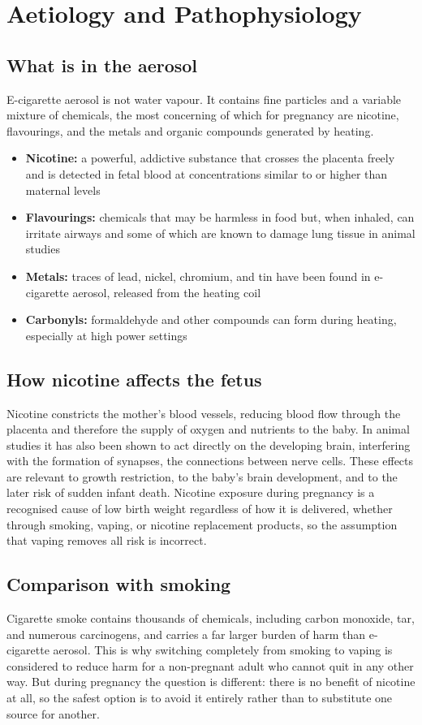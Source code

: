 \section*{Aetiology and Pathophysiology}
\subsection*{What is in the aerosol}
E-cigarette aerosol is not water vapour. It contains fine particles and a variable mixture of chemicals, the most concerning of which for pregnancy are nicotine, flavourings, and the metals and organic compounds generated by heating.

\begin{itemize}
    \item \textbf{Nicotine:} a powerful, addictive substance that crosses the placenta freely and is detected in fetal blood at concentrations similar to or higher than maternal levels
    \item \textbf{Flavourings:} chemicals that may be harmless in food but, when inhaled, can irritate airways and some of which are known to damage lung tissue in animal studies
    \item \textbf{Metals:} traces of lead, nickel, chromium, and tin have been found in e-cigarette aerosol, released from the heating coil
    \item \textbf{Carbonyls:} formaldehyde and other compounds can form during heating, especially at high power settings
\end{itemize}

\subsection*{How nicotine affects the fetus}
Nicotine constricts the mother's blood vessels, reducing blood flow through the placenta and therefore the supply of oxygen and nutrients to the baby. In animal studies it has also been shown to act directly on the developing brain, interfering with the formation of synapses, the connections between nerve cells. These effects are relevant to growth restriction, to the baby's brain development, and to the later risk of sudden infant death. Nicotine exposure during pregnancy is a recognised cause of low birth weight regardless of how it is delivered, whether through smoking, vaping, or nicotine replacement products, so the assumption that vaping removes all risk is incorrect.

\subsection*{Comparison with smoking}
Cigarette smoke contains thousands of chemicals, including carbon monoxide, tar, and numerous carcinogens, and carries a far larger burden of harm than e-cigarette aerosol. This is why switching completely from smoking to vaping is considered to reduce harm for a non-pregnant adult who cannot quit in any other way. But during pregnancy the question is different: there is no benefit of nicotine at all, so the safest option is to avoid it entirely rather than to substitute one source for another.

